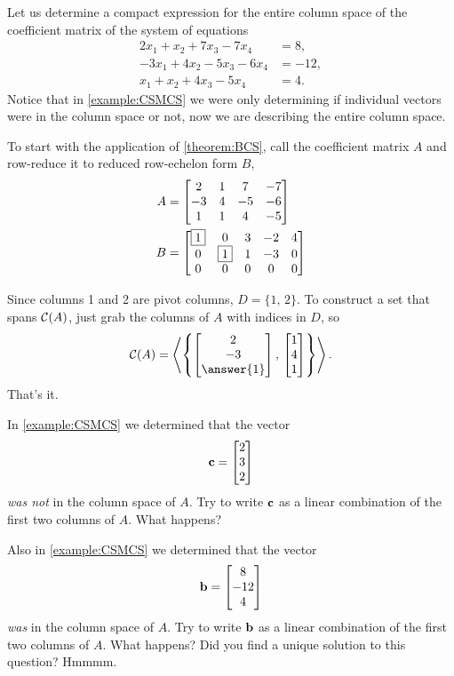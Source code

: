 \documentclass{ximera}
\begin{document}
\begin{example}

  Let us determine a compact expression for the entire column space of
  the coefficient matrix of the system of equations
  \begin{align*}
    2x_1  + x_2 + 7x_3 - 7x_4 &= 8, \\
    -3x_1 + 4x_2 -5x_3 - 6x_4 &=  -12, \\
    x_1 +x_2 + 4x_3 - 5x_4 &=  4.
  \end{align*}
  Notice that in \ref{example:CSMCS} we were only determining if
  individual vectors were in the column space or not, now we are
  describing the entire column space.

  To start with the application of \ref{theorem:BCS}, call the
  coefficient matrix $A$ and row-reduce it to reduced row-echelon form
  $B$,
  \begin{align*}
    A&=\begin{bmatrix}
      2 & 1 & 7 & -7\\
      -3 & 4 &  -5 & -6\\
      1 & 1 & 4 &  -5
    \end{bmatrix} \\
    B&= \begin{bmatrix}
      \fbox{1} & 0 & 3 & -2 & 4 \\
      0 & \fbox{1} & 1 &  -3 & 0\\
      0 & 0 & 0 &  0 & 0
    \end{bmatrix}
  \end{align*}

  Since columns 1 and 2 are pivot columns, $D=\{1,\,2\}$.  To
  construct a set that spans $\mathcal{C}\!\left(A\right)$, just grab the columns of $A$
  with indices in $D$, so
  \[
    \csp{A}=\spn{\set{\colvector{2\\-3\\\answer{1}},\,\colvector{1\\4\\1}}}.
  \]
  That's it.

  In \ref{example:CSMCS} we determined that the vector
  \[
    \mathbf{c}=\begin{bmatrix}2\\3\\2\end{bmatrix}
  \]
  \textit{was not} in the column space of $A$.  Try to write
  $\mathbf{c}$ as a linear combination of the first two columns of $A$.
  What happens?

  Also in \ref{example:CSMCS} we determined that the vector
  \[
    \mathbf{b}=\begin{bmatrix}8\\-12\\4\end{bmatrix}
  \]
  \textit{was} in the column space of $A$.  Try to write $\mathbf{b}$ as
  a linear combination of the first two columns of $A$.  What happens?
  Did you find a unique solution to this question?  Hmmmm.
\end{example}
\end{document}
